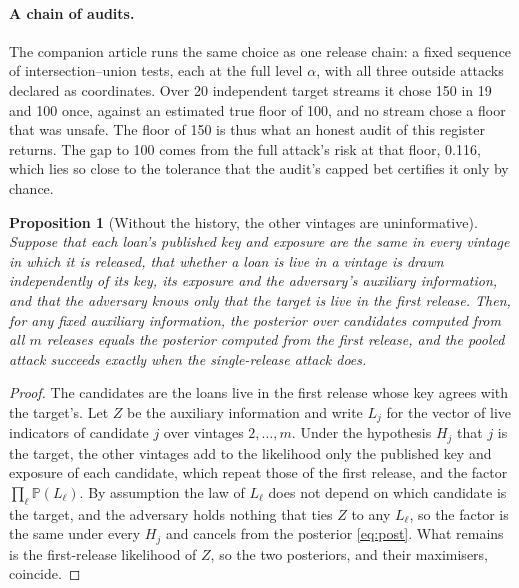 \documentclass[11pt,a4paper]{article}
\theoremstyle{plain}
\newtheorem{proposition}{Proposition}
\theoremstyle{definition}
\theoremstyle{definition}
\theoremstyle{plain}
\newcommand{\Prob}{\mathbb{P}}
\begin{document}


\paragraph{A chain of audits.} The companion article runs the same choice as one
release chain: a fixed sequence of intersection--union tests, each at the full
level $\alpha$, with all three outside attacks declared as coordinates. Over 20
independent target streams it chose 150 in 19 and 100 once, against an estimated
true floor of 100, and no stream chose a floor that was unsafe. The floor of 150
is thus what an honest audit of this register returns. The gap to 100 comes from
the full attack's risk at that floor, 0.116, which lies so close to the tolerance
that the audit's capped bet certifies it only by chance.

\begin{proposition}[Without the history, the other vintages are uninformative]\label{prop:nohistory}
Suppose that each loan's published key and exposure are the same in every vintage
in which it is released, that whether a loan is live in a vintage is drawn
independently of its key, its exposure and the adversary's auxiliary information,
and that the adversary knows only that the target is live in the first release.
Then, for any fixed auxiliary information, the posterior over candidates computed
from all $m$ releases equals the posterior computed from the first release, and the
pooled attack succeeds exactly when the single-release attack does.
\end{proposition}

\begin{proof}
The candidates are the loans live in the first release whose key agrees with the
target's. Let $Z$ be the auxiliary information and write $L_j$ for the vector of
live indicators of candidate $j$ over vintages $2, \dots, m$. Under the hypothesis
$H_j$ that $j$ is the target, the other vintages add to the likelihood only the
published key and exposure of each candidate, which repeat those of the first
release, and the factor $\prod_\ell \Prob(L_\ell)$. By assumption the law of
$L_\ell$ does not depend on which candidate is the target, and the adversary holds
nothing that ties $Z$ to any $L_\ell$, so the factor is the same under every $H_j$
and cancels from the posterior \eqref{eq:post}. What remains is the first-release
likelihood of $Z$, so the two posteriors, and their maximisers, coincide.
\end{proof}
\end{document}
